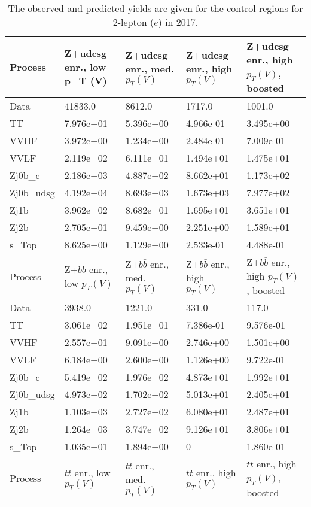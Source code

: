 \begin{table}
\centering
\caption[2017 2-lepton ($e$) control region yields]{
                  The observed and predicted yields are given for the
                  control regions for 2-lepton ($e$) in 2017.
                  }
{\footnotesize
\begin{tabularx}{\textwidth}{|X|X|X|X|X|}
\hline
Process & Z+udcsg enr., low p_{T} (V) & Z+udcsg enr., med. $p_{T}(V)$ & Z+udcsg enr., high $p_{T}(V)$ & Z+udcsg enr., high $p_{T}(V)$, boosted \\
\hline
Data & 41833.0 & 8612.0 & 1717.0 & 1001.0 \\
\hline
TT & 7.976e+01 & 5.396e+00 & 4.966e-01 & 3.495e+00 \\
VVHF & 3.972e+00 & 1.234e+00 & 2.484e-01 & 7.009e-01 \\
VVLF & 2.119e+02 & 6.111e+01 & 1.494e+01 & 1.475e+01 \\
Zj0b\_c & 2.186e+03 & 4.887e+02 & 8.662e+01 & 1.173e+02 \\
Zj0b\_udsg & 4.192e+04 & 8.693e+03 & 1.673e+03 & 7.977e+02 \\
Zj1b & 3.962e+02 & 8.682e+01 & 1.695e+01 & 3.651e+01 \\
Zj2b & 2.705e+01 & 9.459e+00 & 2.251e+00 & 1.589e+01 \\
s\_Top & 8.625e+00 & 1.129e+00 & 2.533e-01 & 4.488e-01 \\
\hline
\hline
Process & Z+$b\bar{b}$ enr., low $p_{T}(V)$ & Z+$b\bar{b}$ enr., med. $p_{T}(V)$ & Z+$b\bar{b}$ enr., high $p_{T}(V)$ & Z+$b\bar{b}$ enr., high $p_{T}(V)$, boosted \\
\hline
Data & 3938.0 & 1221.0 & 331.0 & 117.0 \\
\hline
TT & 3.061e+02 & 1.951e+01 & 7.386e-01 & 9.576e-01 \\
VVHF & 2.557e+01 & 9.091e+00 & 2.746e+00 & 1.501e+00 \\
VVLF & 6.184e+00 & 2.600e+00 & 1.126e+00 & 9.722e-01 \\
Zj0b\_c & 5.419e+02 & 1.976e+02 & 4.873e+01 & 1.992e+01 \\
Zj0b\_udsg & 4.973e+02 & 1.702e+02 & 5.013e+01 & 2.405e+01 \\
Zj1b & 1.103e+03 & 2.727e+02 & 6.080e+01 & 2.487e+01 \\
Zj2b & 1.264e+03 & 3.747e+02 & 9.126e+01 & 3.806e+01 \\
s\_Top & 1.035e+01 & 1.894e+00 & 0 & 1.860e-01 \\
\hline
\hline
Process & $t\bar{t}$ enr., low $p_{T}(V)$ & $t\bar{t}$ enr., med. $p_{T}(V)$ & $t\bar{t}$ enr., high $p_{T}(V)$ & $t\bar{t}$ enr., high $p_{T}(V)$, boosted \\

\end{tabularx}}
\end{table}
